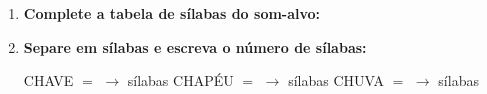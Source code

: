 \begin{exercicio}
\begin{enumerate}[resume]
  \item \textbf{Complete a tabela de sílabas do som-alvo:}

\begin{center}
\end{center}

  \item \textbf{Separe em sílabas e escreva o número de sílabas:}
  \begin{center}
  CHAVE $=$ \underline{\hspace{1.2cm}} $\rightarrow$ \underline{\hspace{0.8cm}} sílabas \quad CHAPÉU $=$ \underline{\hspace{1.2cm}} $\rightarrow$ \underline{\hspace{0.8cm}} sílabas \quad CHUVA $=$ \underline{\hspace{1.2cm}} $\rightarrow$ \underline{\hspace{0.8cm}} sílabas
  \end{center}

\end{enumerate}

\end{exercicio}



